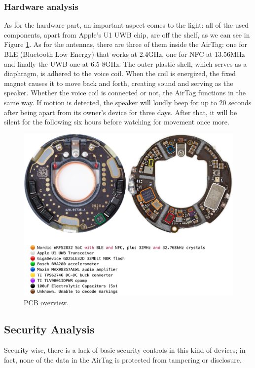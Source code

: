 \documentclass[english]{article}
\begin{document}
\subsubsection{Hardware analysis}\label{hw}
As for the hardware part, an important aspect comes to the light: all of the used components, apart from Apple's U1 UWB chip, are off the shelf, as we can see in Figure \ref{img:pcb}.
As for the antennas, there are three of them inside the AirTag: one for BLE (Bluetooth Low Energy) that works at 2.4GHz, one for NFC at 13.56MHz and finally the UWB one at 6.5-8GHz.
The outer plastic shell, which serves as a diaphragm, is adhered to the voice coil. When the coil is energized, the fixed magnet causes it to move back and forth, creating sound and serving as the speaker.
Whether the voice coil is connected or not, the AirTag functions in the same way.
If motion is detected, the speaker will loudly beep for up to 20 seconds after being apart from its owner's device for three days. After that, it will be silent for the following six hours before watching for movement once more.
\begin{figure}[]
	\centering
	\includegraphics[width=1.1\textwidth]{images/pcb.png}
	\caption{PCB overview.}
	\label{img:pcb}
\end{figure}

\subsection{Security Analysis}
Security-wise, there is a lack of basic security controls in this kind of devices; in fact, none of the data in the AirTag is protected from tampering or disclosure.
\end{document}
